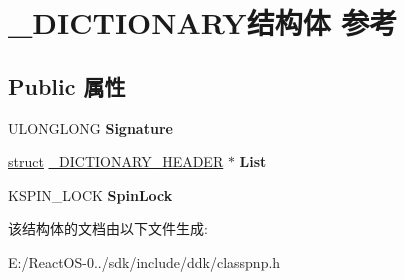 \hypertarget{struct___d_i_c_t_i_o_n_a_r_y}{}\section{\+\_\+\+D\+I\+C\+T\+I\+O\+N\+A\+R\+Y结构体 参考}
\label{struct___d_i_c_t_i_o_n_a_r_y}
\subsection*{Public 属性}
\begin{DoxyCompactItemize}
\item 
\mbox{\label{struct___d_i_c_t_i_o_n_a_r_y_a025d9f18b8d4118d46e0f03570aaf21b}} 
U\+L\+O\+N\+G\+L\+O\+NG {\bfseries Signature}
\item 
\mbox{\label{struct___d_i_c_t_i_o_n_a_r_y_ae44e040c4646d9b8229c142052db91fb}} 
\hyperlink{interfacestruct}{struct} \hyperlink{struct___d_i_c_t_i_o_n_a_r_y___h_e_a_d_e_r}{\+\_\+\+D\+I\+C\+T\+I\+O\+N\+A\+R\+Y\+\_\+\+H\+E\+A\+D\+ER} $\ast$ {\bfseries List}
\item 
\mbox{\label{struct___d_i_c_t_i_o_n_a_r_y_a42c7acdbe62c15e9d3315a30e117194b}} 
K\+S\+P\+I\+N\+\_\+\+L\+O\+CK {\bfseries Spin\+Lock}
\end{DoxyCompactItemize}


该结构体的文档由以下文件生成\+:\begin{DoxyCompactItemize}
\item 
E\+:/\+React\+O\+S-\/0../sdk/include/ddk/classpnp.\+h\end{DoxyCompactItemize}
